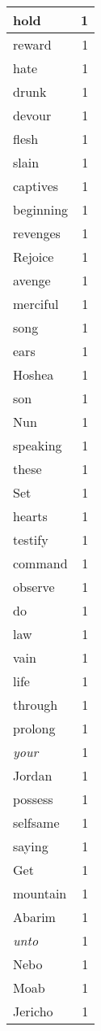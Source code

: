 \begin{center}
\begin{longtable}{l|r}
hold & 1 \\ \hline
reward & 1 \\ \hline
hate & 1 \\ \hline
drunk & 1 \\ \hline
devour & 1 \\ \hline
flesh & 1 \\ \hline
slain & 1 \\ \hline
captives & 1 \\ \hline
beginning & 1 \\ \hline
revenges & 1 \\ \hline
Rejoice & 1 \\ \hline
avenge & 1 \\ \hline
merciful & 1 \\ \hline
song & 1 \\ \hline
ears & 1 \\ \hline
Hoshea & 1 \\ \hline
son & 1 \\ \hline
Nun & 1 \\ \hline
speaking & 1 \\ \hline
these & 1 \\ \hline
Set & 1 \\ \hline
hearts & 1 \\ \hline
testify & 1 \\ \hline
command & 1 \\ \hline
observe & 1 \\ \hline
do & 1 \\ \hline
law & 1 \\ \hline
vain & 1 \\ \hline
life & 1 \\ \hline
through & 1 \\ \hline
prolong & 1 \\ \hline
\emph{your} & 1 \\ \hline
Jordan & 1 \\ \hline
possess & 1 \\ \hline
selfsame & 1 \\ \hline
saying & 1 \\ \hline
Get & 1 \\ \hline
mountain & 1 \\ \hline
Abarim & 1 \\ \hline
\emph{unto} & 1 \\ \hline
Nebo & 1 \\ \hline
Moab & 1 \\ \hline
Jericho & 1 \\ \hline

\end{longtable}
\end{center}
